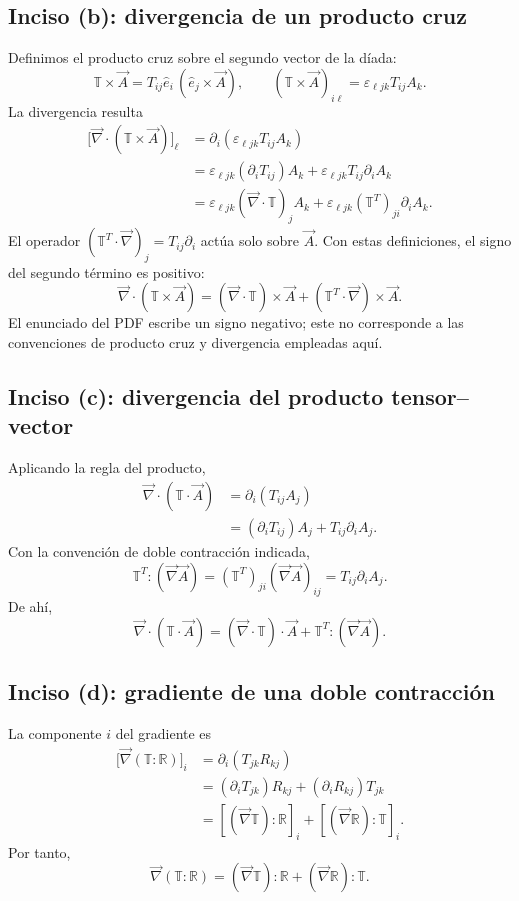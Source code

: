 \subsection*{Inciso (b): divergencia de un producto cruz}

Definimos el producto cruz sobre el segundo vector de la díada:
\[
\mathbb T\times\vec A
=T_{ij}\hat e_i\,(\hat e_j\times\vec A),
\qquad (\mathbb T\times\vec A)_{i\ell}
=\varepsilon_{\ell jk}T_{ij}A_k.
\]
La divergencia resulta
\[
\begin{aligned}
\bigl[\vec\nabla\cdot(\mathbb T\times\vec A)\bigr]_\ell
&=\partial_i(\varepsilon_{\ell jk}T_{ij}A_k)\\
&=\varepsilon_{\ell jk}(\partial_iT_{ij})A_k
+\varepsilon_{\ell jk}T_{ij}\partial_iA_k\\
&=\varepsilon_{\ell jk}(\vec\nabla\cdot\mathbb T)_jA_k
+\varepsilon_{\ell jk}(\mathbb T^T)_{ji}\partial_iA_k.
\end{aligned}
\]
El operador $(\mathbb T^T\cdot\vec\nabla)_j=T_{ij}\partial_i$ actúa solo sobre $\vec A$. Con estas definiciones, el signo del segundo término es positivo:
\[
\boxed{\vec\nabla\cdot(\mathbb T\times\vec A)
=(\vec\nabla\cdot\mathbb T)\times\vec A
+(\mathbb T^T\cdot\vec\nabla)\times\vec A}.
\]
El enunciado del PDF escribe un signo negativo; este no corresponde a las convenciones de producto cruz y divergencia empleadas aquí.

\subsection*{Inciso (c): divergencia del producto tensor--vector}

Aplicando la regla del producto,
\[
\begin{aligned}
\vec\nabla\cdot(\mathbb T\cdot\vec A)
&=\partial_i(T_{ij}A_j)\\
&=(\partial_iT_{ij})A_j+T_{ij}\partial_iA_j.
\end{aligned}
\]
Con la convención de doble contracción indicada,
\[
\mathbb T^T:(\vec\nabla\vec A)
=(\mathbb T^T)_{ji}(\vec\nabla\vec A)_{ij}
=T_{ij}\partial_iA_j.
\]
De ahí,
\[
\boxed{\vec\nabla\cdot(\mathbb T\cdot\vec A)
=(\vec\nabla\cdot\mathbb T)\cdot\vec A
+\mathbb T^T:(\vec\nabla\vec A)}.
\]

\subsection*{Inciso (d): gradiente de una doble contracción}

La componente $i$ del gradiente es
\[
\begin{aligned}
\bigl[\vec\nabla(\mathbb T:\mathbb R)\bigr]_i
&=\partial_i(T_{jk}R_{kj})\\
&=(\partial_iT_{jk})R_{kj}
+(\partial_iR_{kj})T_{jk}\\
&=[(\vec\nabla\mathbb T):\mathbb R]_i
+[(\vec\nabla\mathbb R):\mathbb T]_i.
\end{aligned}
\]
Por tanto,
\[
\boxed{\vec\nabla(\mathbb T:\mathbb R)
=(\vec\nabla\mathbb T):\mathbb R
+(\vec\nabla\mathbb R):\mathbb T}.
\]